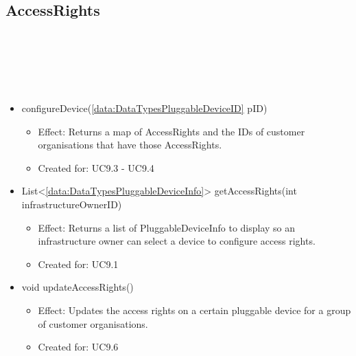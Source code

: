   \subsection{AccessRights}\label{int:OnlineServiceOnlineServiceInfrastructureOwnerFacadeAccessRights}
    \begin{description}
      \item[Provided by:] \iconcomponent{}~
      \item[Required by:] \iconcomponent{}~
      \item[Operations:] ~
    \begin{itemize}[noitemsep,nolistsep,leftmargin=-.25cm]
      \item \textsf{ configureDevice(\ref{data:DataTypesPluggableDeviceID} pID)}
        \begin{itemize}[noitemsep,nolistsep]
           \item Effect: Returns a map of AccessRights and the IDs of customer organisations that have those AccessRights.
\item Created for: UC9.3 - UC9.4
        \end{itemize}
      \item \textsf{List\textless{}\ref{data:DataTypesPluggableDeviceInfo}\textgreater{} getAccessRights(int infrastructureOwnerID)}
        \begin{itemize}[noitemsep,nolistsep]
           \item Effect: Returns a list of PluggableDeviceInfo to display so an infrastructure owner can select a device to configure access rights.
\item Created for: UC9.1
        \end{itemize}
      \item \textsf{void updateAccessRights()}
        \begin{itemize}[noitemsep,nolistsep]
           \item Effect: Updates the access rights on a certain pluggable device for a group of customer organisations.
\item Created for: UC9.6
        \end{itemize}
    \end{itemize}
    \end{description}

